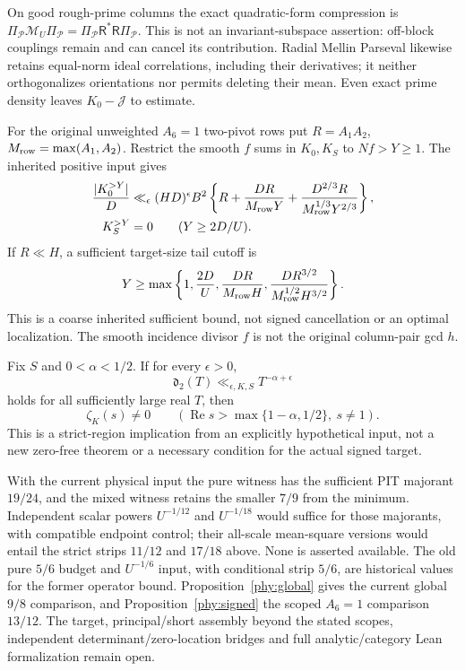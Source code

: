 On good rough-prime columns the exact quadratic-form compression is
$\Pi_{\mathcal P}\mathcal M_U\Pi_{\mathcal P}
 =\Pi_{\mathcal P}\mathsf R^*\mathsf R\Pi_{\mathcal P}$.
This is not an invariant-subspace assertion: off-block couplings remain
and can cancel its contribution. Radial Mellin Parseval likewise
retains equal-norm ideal correlations, including their derivatives;
it neither orthogonalizes orientations nor permits deleting their mean.
Even exact prime density leaves $K_0-\mathcal J$ to estimate.

\begin{proposition}\label{cmr:tail}
For the original unweighted $A_6=1$ two-pivot rows put
$R=A_1A_2$, $M_{\rm row}=\max(A_1,A_2)$.
Restrict the smooth $f$ sums in $K_0,K_S$ to $Nf>Y\ge1$.
The inherited positive input gives
\begin{equation}\label{cmr:tailbound}
 \begin{aligned}
 \frac{|K_0^{>Y}|}D&\ll_\epsilon(HD)^\epsilon B^2
 \left\{R+\frac{DR}{M_{\rm row}Y}
       +\frac{D^{2/3}R}{M_{\rm row}^{1/3}Y^{2/3}}\right\},\\
 K_S^{>Y}&=0\qquad(Y\ge2D/U).
 \end{aligned}
\end{equation}
If $R\ll H$, a sufficient target-size tail cutoff is
\[
 Y\ge\max\left\{1,\frac{2D}U,\frac{DR}{M_{\rm row}H},
       \frac{DR^{3/2}}{M_{\rm row}^{1/2}H^{3/2}}\right\}.
\]
This is a coarse inherited sufficient bound, not signed cancellation
or an optimal localization. The smooth incidence divisor $f$ is not
the original column-pair gcd $h$.
\end{proposition}

\begin{theorem}\label{cmr:conditional-strip}
Fix $S$ and $0<\alpha<1/2$. If for every $\epsilon>0$,
\[
 \mathfrak d_2(T)\ll_{\epsilon,K,S}T^{-\alpha+\epsilon}
\]
holds for all sufficiently large real $T$, then
\[
 \zeta_K(s)\ne0\qquad
   (\operatorname{Re}s>\max\{1-\alpha,1/2\},\ s\ne1).
\]
This is a strict-region implication from an explicitly hypothetical
input, not a new zero-free theorem or a necessary condition for the
actual signed target.
\end{theorem}

With the current physical input the pure witness has the sufficient
PIT majorant $19/24$, and the mixed witness retains the smaller $7/9$
from the minimum. Independent scalar powers $U^{-1/12}$ and
$U^{-1/18}$ would suffice for those majorants, with compatible endpoint
control; their all-scale mean-square versions would entail the strict
strips $11/12$ and $17/18$ above. None is asserted available.
The old pure $5/6$ budget and $U^{-1/6}$ input, with conditional strip
$5/6$, are historical values for the former operator bound.
Proposition~\ref{phy:global} gives the current global $9/8$ comparison,
and Proposition~\ref{phy:signed} the scoped $A_6=1$ comparison $13/12$.
The target, principal/short assembly beyond the stated scopes,
independent determinant/zero-location bridges and full analytic/category
Lean formalization remain open.
